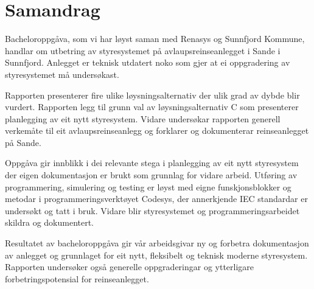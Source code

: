 \chapter{Samandrag}
\thispagestyle{romanpages}

Bacheloroppgåva, som vi har løyst saman med \gls{Renasys} og \gls{Sunnfjord Kommune}, handlar om utbetring av styresystemet på 
avlaupsreinseanlegget i Sande i Sunnfjord. 
Anlegget er teknisk utdatert noko som gjer at ei oppgradering av styresystemet må undersøkast.

Rapporten presenterer fire ulike løysningsalternativ
der ulik grad av dybde blir vurdert. \newline
Rapporten legg til grunn val av løysningsalternativ C som presenterer planlegging av eit nytt styresystem.
Vidare undersøkar rapporten generell verkemåte til eit avlaupsreinseanlegg og forklarer og dokumenterar reinseanlegget på Sande.

Oppgåva gir innblikk i dei relevante stega i planlegging av eit nytt styresystem der eigen dokumentasjon er brukt som grunnlag for vidare arbeid. 
Utføring av programmering, simulering og testing er løyst med eigne funskjonsblokker og metodar i programmeringsverktøyet \gls{Codesys},
der annerkjende \gls{IEC} standardar er undersøkt og tatt i bruk.
Vidare blir styresystemet og programmeringsarbeidet skildra og dokumentert.

Resultatet av bacheloroppgåva gir vår arbeidsgivar ny og forbetra dokumentasjon av anlegget 
og grunnlaget for eit nytt, fleksibelt og teknisk moderne styresystem. 
Rapporten undersøker også generelle oppgraderingar og ytterligare forbetringspotensial for reinseanlegget.